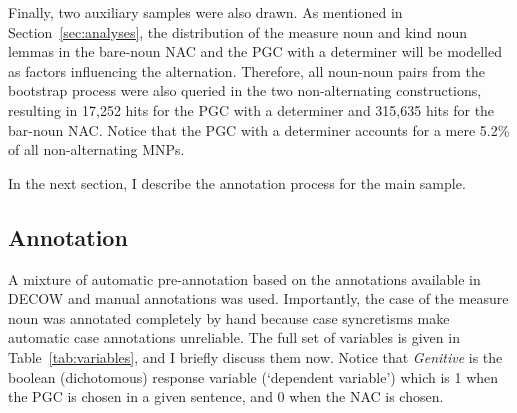 \documentclass[USenglish]{article}
\begin{document}
Finally, two auxiliary samples were also drawn.
As mentioned in Section~\ref{sec:analyses}, the distribution of the measure noun and kind noun lemmas in the bare-noun NAC and the PGC with a determiner will be modelled as factors influencing the alternation.
Therefore, all noun-noun pairs from the bootstrap process were also queried in the two non-alternating constructions, resulting in 17,252 hits for the PGC with a determiner and 315,635 hits for the bar-noun NAC.
Notice that the PGC with a determiner accounts for a mere 5.2\% of all non-alternating MNPs.

In the next section, I describe the annotation process for the main sample.



\subsection{Annotation}
\label{sec:annotation}

A mixture of automatic pre-annotation based on the annotations available in DECOW and manual annotations was used.
Importantly, the case of the measure noun was annotated completely by hand because case syncretisms make automatic case annotations unreliable. 
The full set of variables is given in Table~\ref{tab:variables}, and I briefly discuss them now.
Notice that \textit{Genitive} is the boolean (dichotomous) response variable (`dependent variable') which is 1 when the PGC is chosen in a given sentence, and 0 when the NAC is chosen.
\end{document}
